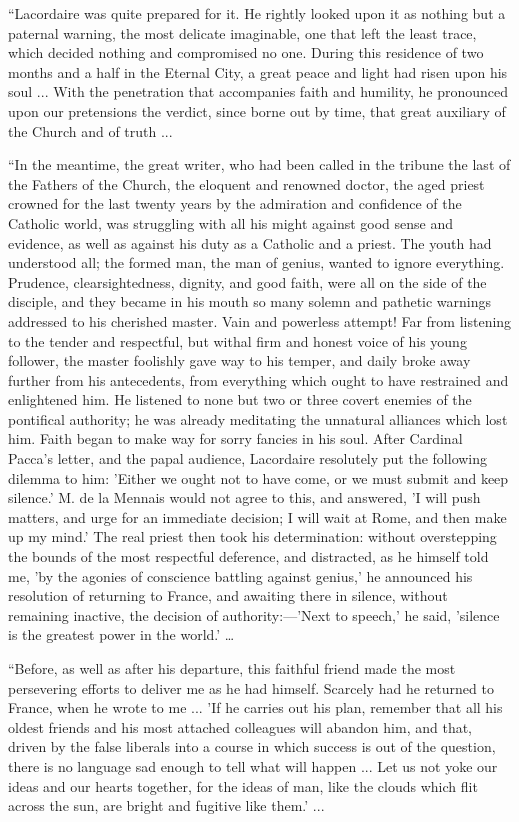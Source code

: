 ``Lacordaire was quite prepared for it. He rightly
looked upon it as nothing but a paternal warning, the most delicate
imaginable, one that left the least trace, which decided nothing and
compromised no one. During this residence of two months and a half in
the Eternal City, a great peace and light had risen upon his soul ...
With the penetration that accompanies faith and humility, he
pronounced upon our pretensions the verdict, since borne out by time,
that great auxiliary of the Church and of truth ...

``In the meantime, the great writer, who had been
called in the tribune the last of the Fathers of the Church, the
eloquent and renowned doctor, the aged priest crowned for the last
twenty years by the admiration and confidence of the Catholic world,
was struggling with all his might against good sense and evidence, as
well as against his duty as a Catholic and a priest. The youth had
understood all; the formed man, the man of genius, wanted to ignore
everything. Prudence, clearsightedness, dignity, and good faith, were
all on the side of the disciple, and they became in his mouth so many
solemn and pathetic warnings addressed to his cherished master. Vain
and powerless attempt! Far from listening to the tender and
respectful, but withal firm and honest voice of his young follower,
the master foolishly gave way to his temper, and daily broke away
further from his antecedents, from everything which ought to have
restrained and enlightened him. He listened to none but two or three
covert enemies of the pontifical authority; he was already meditating
the unnatural alliances which lost him. Faith began to make way for
sorry fancies in his soul. After Cardinal Pacca's letter, and the
papal audience, Lacordaire resolutely put the following dilemma to
him: 'Either we ought not to have come, or we must submit and
keep silence.' M. de la Mennais would not agree to this, and answered,
'I will push matters, and urge for an immediate decision; I will wait
at Rome, and then make up my mind.' The real priest then took his
determination: without overstepping the bounds of the most respectful
deference, and distracted, as he himself told me, 'by the agonies of
conscience battling against genius,' he announced his resolution of
returning to France, and awaiting there in silence, without remaining
inactive, the decision of authority:—'Next to speech,' he said,
'silence is the greatest power in the world.' …

``Before, as well as after his departure, this
faithful friend made the most persevering efforts to deliver me as he
had himself. Scarcely had he returned to France, when he wrote to me
... 'If he carries out his plan, remember that all his oldest friends
and his most attached colleagues will abandon him, and that, driven by
the false liberals into a course in which success is out of the
question, there is no language sad enough to tell what will happen ...
Let us not yoke our ideas and our hearts together, for the ideas of
man, like the clouds which flit across the sun, are bright and
fugitive like them.' ...

